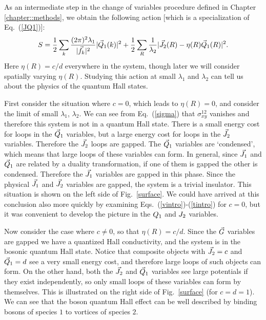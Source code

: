 As an intermediate step in the change of variables procedure defined in Chapter \ref{chapter::methods}, we obtain the following action [which is a specialization of Eq.~(\ref{JQ1})]:
\begin{eqnarray}
S = \frac{1}{2}\sum_{k} \frac{(2\pi)^2\lambda_1}{|\vec{f}_k|^2 } |\vec{Q}_1(k)|^2\label{JQreal}
+ \frac{1}{2}\sum_{R} \frac{1}{\lambda_2} |\vec{J}_2(R) - \eta(R)\vec{Q}_1(R)|^2.\nonumber
\end{eqnarray}
Here $\eta(R)=c/d$ everywhere in the system, though later we will consider spatially varying $\eta(R)$. Studying this action at small $\lambda_1$ and $\lambda_2$ can tell us about the physics of the quantum Hall states.

First consider the situation where $c=0$, which leads to $\eta(R)=0$, and consider the limit of small $\lambda_1$, $\lambda_2$. We can see from Eq.~(\ref{sigma}) that $\sigma^{12}_{xy}$ vanishes and therefore this system is not in a quantum Hall state. 
There is a small energy cost for loops in the $\vec{Q}_1$ variables, but a large energy cost for loops in the $\vec{J}_2$ variables. Therefore the $\vec{J}_2$ loops are gapped. The $\vec{Q}_1$ variables are `condensed', which means that large loops of these variables can form. In general, since $\vec{J}_1$ and $\vec{Q}_1$ are related by a duality transformation, if one of them is gapped the other is condensed. Therefore the $\vec{J}_1$ variables are gapped in this phase. Since the physical $\vec{J}_1$ and $\vec{J}_2$ variables are gapped, the system is a trivial insulator. This situation is shown on the left side of Fig.~\ref{surface}.  We could have arrived at this conclusion also more quickly by examining Eqs.~(\ref{vintro})-(\ref{tintro}) for $c=0$, but it was convenient to develop the picture in the $Q_1$ and $J_2$ variables.

Now consider the case where $c\neq0$, so that $\eta(R)=c/d$. Since the $\vec{G}$ variables are gapped we have a quantized Hall conductivity, and the system is in the bosonic quantum Hall state.
Notice that composite objects with $\vec{J}_2=c$ and $\vec{Q}_1=d$ see a very small energy cost, and therefore large loops of such objects can form.  On the other hand, both the $\vec{J}_2$ and $\vec{Q}_1$ variables see large potentials if they exist independently, so only small loops of these variables can form by themselves. This is illustrated on the right side of Fig.~\ref{surface} (for $c=d=1$). We can see that the boson quantum Hall effect can be well described by binding bosons of species $1$ to vortices of species $2$. 

